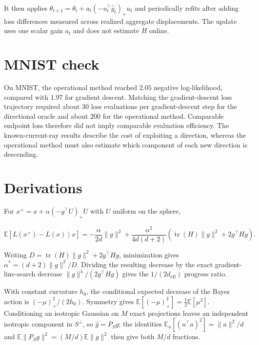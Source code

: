 \documentclass[11pt]{article}
\begin{document}
It then applies \(\theta_{t+1}=\theta_t+a_t(-u_t^\top\widehat g_t)_+u_t\) and periodically refits after adding loss differences measured across realized aggregate displacements. The update uses one scalar gain \(a_t\) and does not estimate \(H\) online.

\section{MNIST check}\label{mnist-check}

On MNIST, the operational method reached \(2.05\) negative log-likelihood, compared with \(1.97\) for gradient descent. Matching the gradient-descent loss trajectory required about \(30\) loss evaluations per gradient-descent step for the directional oracle and about \(200\) for the operational method. Comparable endpoint loss therefore did not imply comparable evaluation efficiency. The known-current-ray results describe the cost of exploiting a direction, whereas the operational method must also estimate which component of each new direction is descending.

\section{Derivations}\label{derivations}

For \(x^+=x+\alpha(-g^\top U)_+U\) with \(U\) uniform on the sphere,

\[
\mathbb E[L(x^+)-L(x)\mid x]
=-\frac{\alpha}{2d}\lVert g\rVert^2
+\frac{\alpha^2}{4d(d+2)}
\left(\operatorname{tr}(H)\lVert g\rVert^2+2g^\top Hg\right).
\]

Writing \(D=\operatorname{tr}(H)\lVert g\rVert^2+2g^\top Hg\), minimization gives \(\alpha^*=(d+2)\lVert g\rVert^2/D\). Dividing the resulting decrease by the exact gradient-line-search decrease \(\lVert g\rVert^4/(2g^\top Hg)\) gives the \(1/(2d_{\mathrm{eff}})\) progress ratio.

With constant curvature \(h_0\), the conditional expected decrease of the Bayes action is \(({-\mu})_+^2/(2h_0)\). Symmetry gives \(\mathbb E[({-\mu})_+^2]=\tfrac12\mathbb E[\mu^2]\). Conditioning an isotropic Gaussian on \(M\) exact projections leaves an independent isotropic component in \(S^\perp\), so \(\widehat g=P_Sg\); the identities \(\mathbb E_u[(u^\top a)^2]=\lVert a\rVert^2/d\) and \(\mathbb E\lVert P_Sg\rVert^2=(M/d)\mathbb E\lVert g\rVert^2\) then give both \(M/d\) fractions.
\end{document}
